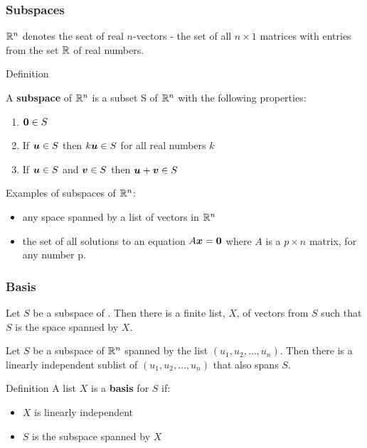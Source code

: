 \documentclass{beamer}
\begin{document}
\begin{frame}
  \frametitle{Subspaces}

$\mathbb{R}^n$  denotes the seat of real $n$-vectors - the set of all $n \times 1$ matrices with entries from the set $\mathbb{R}$ of real numbers.
\medskip

\begin{block}{Definition}

A \textbf{subspace} of $\mathbb{R}^n$ is a subset S of $\mathbb{R}^n$ with the following properties:
\begin{enumerate}
    \item $\bm{0} \in S$
    \item If $\bm{u} \in S$ then $k\bm{u} \in S$ for all real numbers $k$
    \item If $\bm{u} \in S$ and  $\bm{v} \in S$ then $\bm{u} + \bm{v} \in S$
\end{enumerate}

\end{block}

Examples of subspaces of $\mathbb{R}^n$:
\begin{itemize}
    \item any space spanned by a list of vectors in $\mathbb{R}^n$
    \item the set of all solutions to an equation $A\bm{x} = \bm{0}$ where $A$ is a $p \times n$ matrix, for any number p.
\end{itemize}

\end{frame}

\begin{frame}
  \frametitle{Basis}

Let $S$ be a subspace of \RealN.  Then there is a finite list, $X$, of vectors from $S$ such that $S$ is the space spanned by $X$.
\medskip

Let $S$ be a subspace of $\mathbb{R}^n$ spanned by the list $(u_1, u_2, \ldots, u_n)$. Then  there is a linearly independent sublist of $(u_1, u_2, \ldots, u_n)$ that also spans $S$.
\medskip

\begin{block}{Definition}
A list $X$ is a \textbf{basis} for $S$ if:
\begin{itemize}
\item $X$ is linearly independent
\item $S$ is the subspace spanned by $X$
\end{itemize}
\end{block}

\end{frame}
\end{document}

